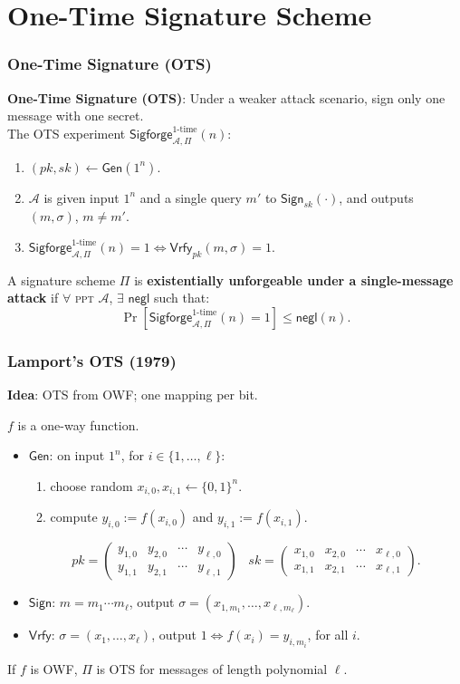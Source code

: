 \section{One-Time Signature Scheme}
\begin{frame}\frametitle{One-Time Signature (OTS)}
\textbf{One-Time Signature (OTS)}: Under a weaker attack scenario, sign only one message with one secret.\\
The OTS experiment $\mathsf{Sigforge}_{\mathcal{A},\Pi }^{\text{1-time}}(n)$:
\begin{enumerate}
\item $(pk,sk) \gets \mathsf{Gen}(1^n)$.
\item $\mathcal{A}$ is given input $1^n$ and a \alert{single query} $m'$ to $\mathsf{Sign}_{sk}(\cdot)$, and outputs $(m,\sigma)$, $m \neq m'$.
\item $\mathsf{Sigforge}_{\mathcal{A},\Pi }^{\text{1-time}}(n)=1 \iff \mathsf{Vrfy}_{pk}(m,\sigma)=1$. 
\end{enumerate}
\begin{definition}
A signature scheme $\Pi$ is \textbf{existentially unforgeable under a single-message attack} if $\forall$ \textsc{ppt} $\mathcal{A}$, $\exists$ $\mathsf{negl}$ such that:
\[ \Pr [\mathsf{Sigforge}_{\mathcal{A},\Pi }^{\text{1-time}}(n)=1] \le \mathsf{negl}(n).
\]
\end{definition}
\end{frame}
\begin{frame}\frametitle{Lamport's OTS (1979)}
\textbf{Idea}: OTS from OWF; one mapping per bit.
\begin{construction}
$f$ is a one-way function.
\begin{itemize}
\item $\mathsf{Gen}$: on input $1^n$, for $i \in \{1,\dotsc, \ell\}$:
\begin{enumerate}
\item choose random $x_{i,0}, x_{i,1} \gets \{0,1\}^n$.
\item compute $y_{i,0} := f(x_{i,0})$ and $y_{i,1} := f(x_{i,1})$.
\end{enumerate}
\[ pk = \begin{pmatrix} y_{1,0} & y_{2,0} & \cdots & y_{\ell,0} \\
y_{1,1} & y_{2,1} & \cdots & y_{\ell,1} \end{pmatrix}\;\;\; sk = \begin{pmatrix} x_{1,0} & x_{2,0} & \cdots & x_{\ell,0} \\
x_{1,1} & x_{2,1} & \cdots & x_{\ell,1} \end{pmatrix}. \]
\item $\mathsf{Sign}$: $m = m_1\cdots m_{\ell}$, output $\sigma = (x_{1,m_1},\dotsc,x_{\ell,m_{\ell}})$.
\item $\mathsf{Vrfy}$:  $\sigma = (x_1,\dotsc,x_{\ell})$, output $1 \iff f(x_i) = y_{i,m_i}$, for all $i$. 
\end{itemize}
\end{construction}
\begin{theorem}
If $f$ is OWF, $\Pi$ is OTS for messages of length polynomial $\ell$.
\end{theorem}
\end{frame}
